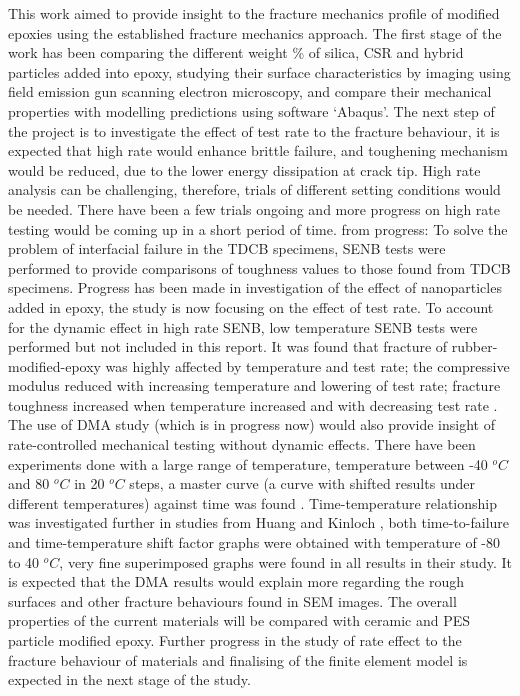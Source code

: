 \documentclass[numbers=noendperiod,chapterprefix=on]{icldt} %
\begin{document}
{This work aimed to provide insight to the fracture mechanics profile of modified epoxies using the established fracture mechanics approach. The first stage of the work has been comparing the different weight \% of silica, CSR and hybrid particles added into epoxy, studying their surface characteristics by imaging using field emission gun scanning electron microscopy, and compare their mechanical properties with modelling predictions using software ‘Abaqus'.
The next step of the project is to investigate the effect of test rate to the fracture behaviour, it is expected that high rate would enhance brittle failure, and toughening mechanism would be reduced, due to the lower energy dissipation at crack tip. High rate analysis can be challenging, therefore, trials of different setting conditions would be needed. There have been a few trials ongoing and more progress on high rate testing would be coming up in a short period of time.
from progress:
To solve the problem of interfacial failure in the TDCB specimens, SENB tests were performed to provide comparisons of toughness values to those found from TDCB specimens. Progress has been made in investigation of the effect of nanoparticles added in epoxy, the study is now focusing on the effect of test rate. 
To account for the dynamic effect in high rate SENB, low temperature SENB tests were performed but not included in this report. It was found that fracture of rubber-modified-epoxy was highly affected by temperature and test rate; the compressive modulus reduced with increasing temperature and lowering of test rate; fracture toughness increased when temperature increased and with decreasing test rate \cite{Brett2011}. 
The use of DMA study (which is in progress now) would also provide insight of rate-controlled mechanical testing without dynamic effects. There have been experiments done with a large range of temperature, temperature between -40 $^oC$ and 80 $^oC$ in 20 $^oC$ steps, a master curve (a curve with shifted results under different temperatures) against time was found \cite{Brett2011}. Time-temperature relationship was investigated further in studies from Huang and Kinloch \cite{Meschut2013}, both time-to-failure and time-temperature shift factor graphs were obtained with temperature of -80 to 40 $^oC$, very fine superimposed graphs were found in all results in their study. It is expected that the DMA results would explain more regarding the rough surfaces and other fracture behaviours found in SEM images.
The overall properties of the current materials will be compared with ceramic and PES particle modified epoxy. Further progress in the study of rate effect to the fracture behaviour of materials and finalising of the finite element model is expected in the next stage of the study. 

}
\end{document}
